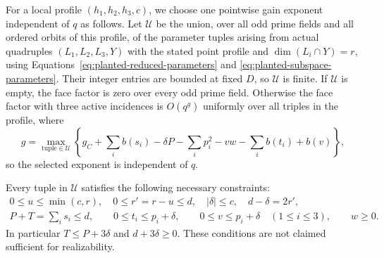 \begin{proposition}\label{prop:planted-gain}
For a local profile $(h_1,h_2,h_3,c)$, we choose one pointwise gain
exponent independent of \(q\) as follows. Let \(\mathcal U\) be the
union, over all odd prime fields and all ordered orbits of this profile,
of the parameter tuples arising from actual quadruples
$(L_1,L_2,L_3,Y)$ with the stated point profile and
$\dim(L_i\cap Y)=r$, using
Equations~\eqref{eq:planted-reduced-parameters} and
\eqref{eq:planted-subspace-parameters}. Their integer entries are bounded
at fixed \(D\), so \(\mathcal U\) is finite. If \(\mathcal U\) is empty,
the face factor is zero over every odd prime field. Otherwise the face
factor with three active incidences is
$O(q^g)$ uniformly over all triples in the profile, where
\begin{equation}\label{eq:planted-gain}
 g=\max_{\text{tuple}\in\mathcal U}\left\{
 g_C+\sum_i b(s_i)-\delta P-\sum_i p_i^2-vw
                   -\sum_i b(t_i)+b(v)\right\},
\end{equation}
so the selected exponent is independent of \(q\).

Every tuple in \(\mathcal U\) satisfies the following necessary
constraints:
\begin{equation}\label{eq:planted-feasibility}
 \begin{gathered}
 0\le u\le\min(c,r),\quad 0\le r'=r-u\le d,
 \quad |\delta|\le c,\quad d-\delta=2r',\\
 P+T=\sum_i s_i\le d,\qquad
 0\le t_i\le p_i+\delta,\qquad
 0\le v\le p_i+\delta\quad(1\le i\le3),\qquad w\ge0.
 \end{gathered}
\end{equation}
In particular $T\le P+3\delta$ and $d+3\delta\ge0$.
These conditions are not claimed sufficient for realizability.
\end{proposition}
